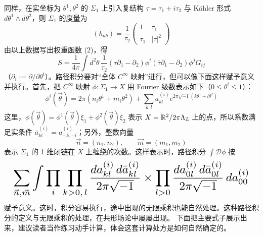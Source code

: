 同样，在实坐标为 $\theta^1,\theta^2$ 的 $\Sigma_1$ 上引入复结构 $\tau=\tau_1+i\tau_2$ 与 Kähler 形式 $d\theta^1\wedge d\theta^2$，则 $\Sigma_1$ 的度量为
\[
  (h_{ab})=\frac{1}{\tau_2}
  \begin{pmatrix} 1 & \tau_1\\ \tau_1 & |\tau|^2\end{pmatrix}
\]
由以上数据写出权重函数 (2)，得
\[
  S=\frac{1}{4\pi}\int d^2\theta\,\frac{1}{\tau_2}
  (\tau\partial_1-\partial_2)\phi^i(\bar\tau\partial_1-\partial_2)\phi^j G_{ij}
\]
（$\partial_i:=\partial/\partial\theta^i$）。路径积分要对“全体 $C^\infty$ 映射”进行，但可以像下面这样赋予意义并执行。首先，把 $C^\infty$ 映射 $\phi\colon\Sigma_1\to X$ 用 Fourier 级数表示如下（$0\le\theta^i\le1$）：
\[
  \phi^i(\vec\theta)=2\pi(n_i\theta^1+m_i\theta^2)
  +\sum_{k,l}a_{kl}^{(i)}e^{2\pi\sqrt{-1}(k\theta^1+l\theta^2)}
\]
这里，$\phi(\vec\theta)=\phi^1(\vec\theta)\xi_1+\phi^2(\vec\theta)\xi_2$ 表示 $X=\mathbb{R}^2/2\pi\Lambda_{\mathbb{Z}}$ 上的点，所以系数满足实条件 $\bar a_{kl}^{(i)}=a_{-k,-l}^{(i)}$；另外，整数向量
\[
  \vec n=(n_1,n_2),\qquad \vec m=(m_1,m_2)
\]
表示 $\Sigma_1$ 的 1 维闭链在 $X$ 上缠绕的次数。这样表示时，路径积分 $\int\mathcal{D}\phi$ 按
\[
  \resizebox{0.97\linewidth}{!}{$\displaystyle
  \sum_{\vec n,\vec m}\int\prod_i\prod_{k>0,\,l}
  \frac{da_{kl}^{(i)}\,d\bar a_{kl}^{(i)}}{2\pi\sqrt{-1}}
  \times\prod_{l>0}\frac{da_{0l}^{(i)}\,d\bar a_{0l}^{(i)}}{2\pi\sqrt{-1}}
  \,da_{00}^{(i)}$}
\]
赋予意义。这时，积分容易执行，途中出现的无限乘积也能自然处理。这种路径积分的定义与无限乘积的处理，在共形场论中屡屡出现。
下面把主要式子展示出来，建议读者当作练习动手计算，体会这套计算处方是如何自然确定的。

